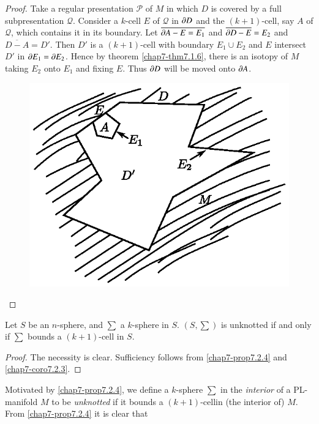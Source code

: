 \begin{proof}
Take a regular presentation $\mathscr{P}$ of $M$ in which $D$ is covered by a full subpresentation $\mathcal{Q}$. Consider a $k$-cell $E$ of $\mathcal{Q}$ in $\partial D$ and the $(k+1)$-cell, say $A$ of $\mathcal{Q}$, which contains it in its boundary. Let $\overline{\partial A-E=E_{1}}$ and $\overline{\partial D-E}=E_{2}$ and $\overline{D-A}=D'$. Then $D'$ is a $(k+1)$-cell with boundary $E_{1}\cup E_{2}$ and $E$ intersect $D'$ in $\partial E_{1}=\partial E_{2}$. Hence by theorem \ref{chap7-thm7.1.6}, there is an isotopy of $M$ taking $E_{2}$ onto $E_{1}$ and fixing $E$. Thus $\partial D$ will be moved onto $\partial A$.
\begin{figure}[H]
\centering
\includegraphics{figure/fig22.eps}
\end{figure}
\end{proof}

\begin{corollary}\label{chap7-coro7.2.5}
Let $S$ be an $n$-sphere, and $\sum$ a $k$-sphere in $S$. $(S,\sum)$ is unknotted if and only if $\sum$ bounds a $(k+1)$-cell in $S$.
\end{corollary}

\begin{proof}
The necessity is clear. Sufficiency follows from \ref{chap7-prop7.2.4} and \ref{chap7-coro7.2.3}. 
\end{proof}

Motivated by \ref{chap7-prop7.2.4}, we define a $k$-sphere $\sum$ in the {\em interior} of a PL-manifold $M$ to be {\em unknotted} if it bounds a $(k+1)$-cell\pageoriginale in (the interior of) $M$. From \ref{chap7-prop7.2.4} it is clear that 

